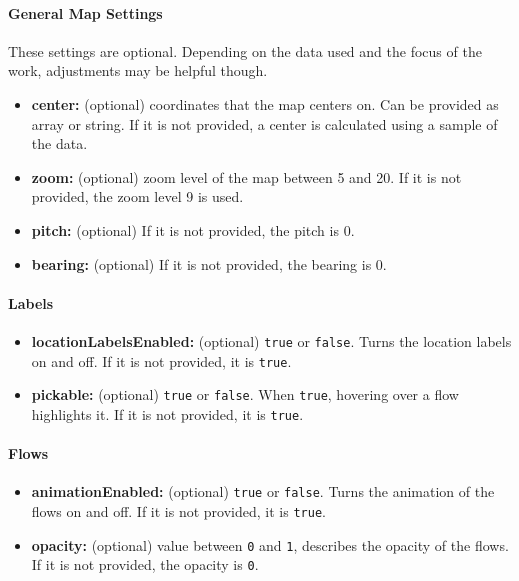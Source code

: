 \hypertarget{general-map-settings}{%
\paragraph{General Map Settings}\label{general-map-settings}}

These settings are optional. Depending on the data used and the focus of
the work, adjustments may be helpful though.

\begin{itemize}
\tightlist
\item
  \textbf{center:} (optional) coordinates that the map centers on. Can
  be provided as array or string. If it is not provided, a center is
  calculated using a sample of the data.
\item
  \textbf{zoom:} (optional) zoom level of the map between 5 and 20. If
  it is not provided, the zoom level 9 is used.
\item
  \textbf{pitch:} (optional) If it is not provided, the pitch is 0.
\item
  \textbf{bearing:} (optional) If it is not provided, the bearing is 0.
\end{itemize}

\hypertarget{labels}{%
\paragraph{Labels}\label{labels}}

\begin{itemize}
\tightlist
\item
  \textbf{locationLabelsEnabled:} (optional) \texttt{true} or
  \texttt{false}. Turns the location labels on and off. If it is not
  provided, it is \texttt{true}.
\item
  \textbf{pickable:} (optional) \texttt{true} or \texttt{false}. When
  \texttt{true}, hovering over a flow highlights it. If it is not
  provided, it is \texttt{true}.
\end{itemize}

\hypertarget{flows}{%
\paragraph{Flows}\label{flows}}

\begin{itemize}
\tightlist
\item
  \textbf{animationEnabled:} (optional) \texttt{true} or \texttt{false}.
  Turns the animation of the flows on and off. If it is not provided, it
  is \texttt{true}.
\item
  \textbf{opacity:} (optional) value between \texttt{0} and \texttt{1},
  describes the opacity of the flows. If it is not provided, the opacity
  is \texttt{0}.
\end{itemize}

